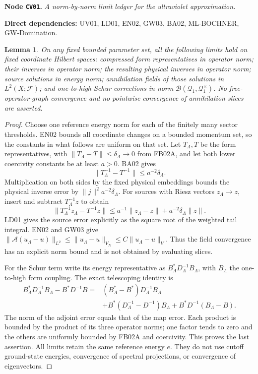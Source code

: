 \documentclass[11pt,a4paper]{article}
\newtheorem{lemma}[theorem]{Lemma}
\theoremstyle{remark}\newtheorem{remark}[theorem]{Remark}
\newcommand{\F}{\mathcal F}\newcommand{\Q}{\mathcal Q}\newcommand{\HH}{\mathcal H}
\newcommand{\node}[3]{\par\Needspace{6\baselineskip}\smallskip\hypertarget{node:#1}{}\label{nodepage:#1}\noindent\textbf{Node \texttt{#1}.} \textit{#2.}\par\noindent\textbf{Direct dependencies:} #3.\par}
\begin{document}
\node{CV01}{A norm-by-norm limit ledger for the ultraviolet approximation}{UV01, LD01, EN02, GW03, BA02, ML-BOCHNER, GW-Domination}
\begin{lemma}\label{lem:cutoffledger}
On any fixed bounded parameter set, all the following limits hold on fixed coordinate Hilbert spaces: compressed form representatives in operator norm; their inverses in operator norm; the resulting physical inverses in operator norm; source solutions in energy norm; annihilation fields of those solutions in $L^2(X;\F)$; and one-to-high Schur corrections in norm $\mathcal B(\Q_1,\Q_1^\times)$. No free-operator-graph convergence and no pointwise convergence of annihilation slices are asserted.
\end{lemma}
\begin{proof}
Choose one reference energy norm for each of the finitely many sector thresholds. EN02 bounds all coordinate changes on a bounded momentum set, so the constants in what follows are uniform on that set. Let $T_\Lambda,T$ be the form representatives, with $\|T_\Lambda-T\|\leq\delta_\Lambda\to0$ from FB02A, and let both lower coercivity constants be at least $a>0$. BA02 gives
\[
 \|T_\Lambda^{-1}-T^{-1}\|
 \leq a^{-2}\delta_\Lambda.
\]
Multiplication on both sides by the fixed physical embeddings bounds the physical inverse error by $\|j\|^2a^{-2}\delta_\Lambda$. For sources with Riesz vectors $z_\Lambda\to z$, insert and subtract $T_\Lambda^{-1}z$ to obtain
\[
 \|T_\Lambda^{-1}z_\Lambda-T^{-1}z\|
 \leq a^{-1}\|z_\Lambda-z\|+a^{-2}\delta_\Lambda\|z\|.
\]
LD01 gives the source error explicitly as the square root of the weighted tail integral. EN02 and GW03 give
$\|\mathcal A(u_\Lambda-u)\|_{L^2}\leq\|u_\Lambda-u\|_{V_N}\leq C\|u_\Lambda-u\|_V$.
Thus the field convergence has an explicit norm bound and is not obtained by evaluating slices.

For the Schur term write its energy representative as $B_\Lambda^*D_\Lambda^{-1}B_\Lambda$, with $B_\Lambda$ the one-to-high form coupling. The exact telescoping identity is
\begin{align*}
 B_\Lambda^*D_\Lambda^{-1}B_\Lambda-B^*D^{-1}B
 ={}&(B_\Lambda^*-B^*)D_\Lambda^{-1}B_\Lambda\\
 &+B^*(D_\Lambda^{-1}-D^{-1})B_\Lambda
   +B^*D^{-1}(B_\Lambda-B).
\end{align*}
The norm of the adjoint error equals that of the map error. Each product is bounded by the product of its three operator norms; one factor tends to zero and the others are uniformly bounded by FB02A and coercivity. This proves the last assertion. All limits retain the same reference energy $e$. They do not use cutoff ground-state energies, convergence of spectral projections, or convergence of eigenvectors.
\end{proof}
\end{document}
